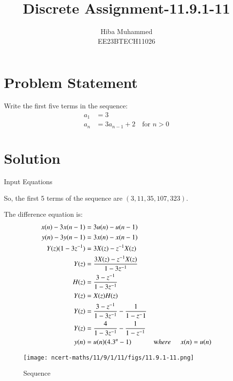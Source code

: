 \documentclass[12pt]{article}
\title{Discrete Assignment-11.9.1-11}
\author{Hiba Muhammed \\
        EE23BTECH11026}
\date{}
\begin{document}
\maketitle

\section*{Problem Statement}
Write the first five terms in the sequence:
\begin{align}
a_{1}  &= 3 \\
a_{n}  &= 3a_{n-1} + 2 \quad \text{for } n > 0
\end{align}

\section*{Solution}
\fi

\begin{table}[h]
  \centering
  
  \caption{Input Equations}
  \label{tab:input-equations-11.9.1-11}
\end{table}

So, the first 5 terms of the sequence are \( (3, 11, 35, 107, 323) \).

The difference equation is:
\begin{align}
x(n) - 3x(n-1) &= 3u(n) - u(n-1) \\
y(n) - 3y(n-1) &= 3x(n) - x(n-1)\\
Y(z)(1 - 3z^{-1}) &= 3X(z) - z^{-1}X(z) \\
Y(z) &= \frac{3X(z) - z^{-1}X(z)}{1 - 3z^{-1}}\\
H(z) &= \frac{3 - z^{-1}}{1 - 3z^{-1}}\\
Y(z) &=X(z)H(z) \\
Y(z)&=\frac{3 - z^{-1}}{1-3z^{-1}}-\frac{1}{1-z^-1}\\
Y(z)&=\frac{4}{1-3z^{-1}}-\frac{1}{1-z^{-1}}\\
y(n)&=u(n)(4.3^{n}-1) &\text where \hspace{0.5cm}x(n)=u(n)
\end{align}

\begin{figure}[h]
    \centering
    \texttt{[image: ncert-maths/11/9/1/11/figs/11.9.1-11.png]}
    \caption{Sequence}
    \label{fig:11.9.1-11}
\end{figure}

\end{document}
